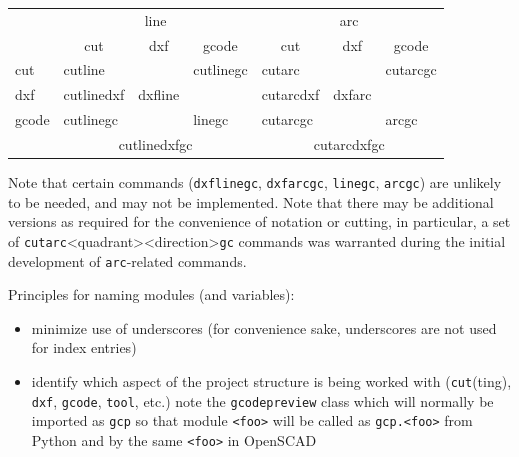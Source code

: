 \documentclass{ltxdoc}
\begin{document}
\noindent\begin{tabular}{lllllll}\toprule
& \multicolumn{3}{c}{line} & \multicolumn{3}{c}{arc}
\\\cmidrule(lr){2-4}\cmidrule(lr){5-7}
      & \multicolumn{1}{c}{cut}& \multicolumn{1}{c}{dxf}& \multicolumn{1}{c}{gcode}& \multicolumn{1}{c}{cut}& \multicolumn{1}{c}{dxf}& \multicolumn{1}{c}{gcode}\\\midrule
cut   & cutline\hphantom{dxf}  &                        &  cutlinegc               & cutarc\hphantom{dxf}   &                        & cutarcgc            \\
dxf   & cutlinedxf             & dxfline\hphantom{gc}   &                          & cutarcdxf              & dxfarc\hphantom{gc}    &                     \\
gcode & cutlinegc              & \hphantom{dxflinegc}   & linegc\hphantom{cut}     & cutarcgc               & \hphantom{dxfarcgc}    & arcgc\hphantom{cut} \\\cmidrule(ll){2-4}\cmidrule(ll){5-7}
& \multicolumn{3}{c}{cutlinedxfgc}                                         & \multicolumn{3}{c}{cutarcdxfgc}\\\bottomrule
\end{tabular}

\bigskip

\noindent Note that certain commands (\verb|dxflinegc|, \verb|dxfarcgc|, \verb|linegc|, \verb|arcgc|) are unlikely to be needed, and may not be implemented. Note that there may be additional versions as required for the convenience of notation or cutting, in particular, a set of \verb|cutarc|<quadrant><direction>\verb|gc| commands was warranted during the initial development of \verb|arc|-related commands.

Principles for naming modules (and variables):

\begin{itemize}
\item minimize use of underscores (for convenience sake, underscores are not used for index entries)
\item identify which aspect of the project structure is being worked with (\texttt{cut}(ting), 
      \texttt{dxf}, \texttt{gcode}, \texttt{tool}, etc.) note the \verb|gcodepreview| class which will 
      normally be imported as \verb|gcp| so that module \verb|<foo>| will be called as
      \verb|gcp.<foo>| from Python and by the same \verb|<foo>| in OpenSCAD
\end{itemize}

\end{document}
